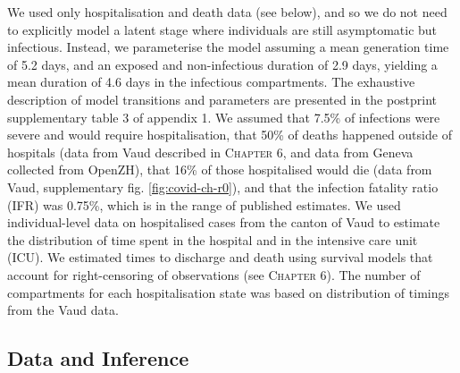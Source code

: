 We used only hospitalisation and death data (see below), and so we do not need to explicitly model a latent stage where individuals are still asymptomatic but infectious\cite{Ganyani:EstimatingGenerationInterval:2020,He:TemporalDynamicsViral:2020, Liu:ContributionPresymptomaticInfection:2020}. Instead, we parameterise the model assuming a mean generation time of 5.2 days\cite{Ganyani:EstimatingGenerationInterval:2020}, and an exposed and non-infectious duration of 2.9 days\cite{He:TemporalDynamicsViral:2020}, yielding a mean duration of 4.6 days in the infectious compartments. The exhaustive description of model transitions and parameters are presented in the postprint supplementary table 3 of appendix 1. We assumed that 7.5\% of infections were severe and would require hospitalisation, that 50\% of deaths happened outside of hospitals (data from Vaud described in \textsc{Chapter 6}, and data from Geneva collected from OpenZH), that 16\% of those hospitalised would die (data from Vaud, supplementary fig. \ref{fig:covid-ch-r0}), and that the infection fatality ratio (IFR) was 0.75\%, which is in the range of published estimates\cite{Verity:EstimatesSeverityCoronavirus:2020, Russell:EstimatingInfectionCase:2020}. We used individual-level data on hospitalised cases from the canton of Vaud to estimate the distribution of time spent in the hospital and in the intensive care unit (ICU). We estimated times to discharge and death using survival models that account for right-censoring of observations (see \textsc{Chapter 6}). The number of compartments for each hospitalisation state was based on distribution of timings from the Vaud data. 
\subsection{Data and Inference} 
